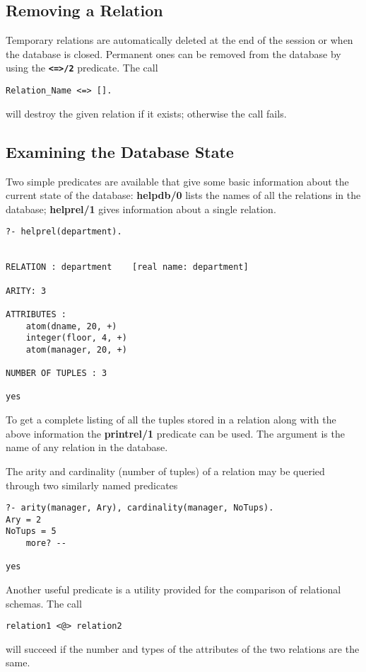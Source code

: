 \subsection{Removing a Relation}
Temporary relations are automatically deleted at the end of the session
or when the database is closed.
Permanent ones can be removed from the database by using
the {\bf \verb-<=>/2-} predicate. The call 
\begin{verbatim}
Relation_Name <=> [].
\end{verbatim}
will destroy the given relation if it exists; otherwise the call fails.

\subsection{Examining the Database State}
Two simple predicates are available that give some basic information
about the current state of the database: 
{\bf helpdb/0} lists the names of all the relations in the database; 
{\bf helprel/1} gives information about a single relation. 
 

\begin{verbatim}
?- helprel(department).


RELATION : department    [real name: department]

ARITY: 3

ATTRIBUTES :
    atom(dname, 20, +)
    integer(floor, 4, +)
    atom(manager, 20, +)

NUMBER OF TUPLES : 3

yes
\end{verbatim}

To get a complete listing of all the tuples stored in a
relation along with the above information the {\bf printrel/1}
predicate can be used.  The argument is the name of any relation in the
database. 


The arity and cardinality (number of tuples) of a relation may 
be queried through two similarly named predicates
 
\begin{verbatim}
?- arity(manager, Ary), cardinality(manager, NoTups).
Ary = 2
NoTups = 5
	more? -- 

yes
\end{verbatim}


Another useful predicate is a utility provided for the comparison
of relational schemas. The call
\begin{verbatim}
relation1 <@> relation2
\end{verbatim}
will succeed if the number and types of the attributes of the 
two relations are the same. 


